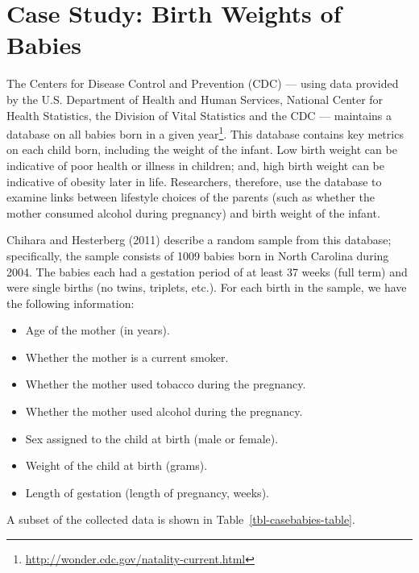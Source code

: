 \documentclass[
  letterpaper,
  DIV=11,
  numbers=noendperiod]{scrreprt}
\providecommand{\tightlist}{%
  \setlength{\itemsep}{0pt}\setlength{\parskip}{0pt}}\usepackage{longtable,booktabs,array}
\theoremstyle{plain}
\theoremstyle{definition}
\theoremstyle{definition}
\theoremstyle{remark}
\begin{document}
\chapter{Case Study: Birth Weights of Babies}\label{sec-casebabies}

The Centers for Disease Control and Prevention (CDC) --- using data
provided by the U.S. Department of Health and Human Services, National
Center for Health Statistics, the Division of Vital Statistics and the
CDC --- maintains a database on all babies born in a given
year\footnote{\url{http://wonder.cdc.gov/natality-current.html}}. This
database contains key metrics on each child born, including the weight
of the infant. Low birth weight can be indicative of poor health or
illness in children; and, high birth weight can be indicative of obesity
later in life. Researchers, therefore, use the database to examine links
between lifestyle choices of the parents (such as whether the mother
consumed alcohol during pregnancy) and birth weight of the infant.

Chihara and Hesterberg (2011) describe a random sample from this
database; specifically, the sample consists of 1009 babies born in North
Carolina during 2004. The babies each had a gestation period of at least
37 weeks (full term) and were single births (no twins, triplets, etc.).
For each birth in the sample, we have the following information:

\begin{itemize}
\tightlist
\item
  Age of the mother (in years).
\item
  Whether the mother is a current smoker.
\item
  Whether the mother used tobacco during the pregnancy.
\item
  Whether the mother used alcohol during the pregnancy.
\item
  Sex assigned to the child at birth (male or female).
\item
  Weight of the child at birth (grams).
\item
  Length of gestation (length of pregnancy, weeks).
\end{itemize}

A subset of the collected data is shown in
Table~\ref{tbl-casebabies-table}.
\end{document}
